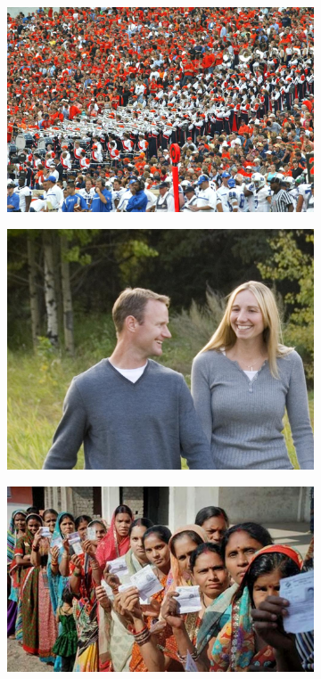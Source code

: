 \begin{figure}[t]
\centering
\begin{subfigure}[b]{0.3\textwidth}
    \includegraphics[width=\textwidth]{figures/data_1}
\end{subfigure}
\begin{subfigure}[b]{0.3\textwidth}
    \includegraphics[width=\textwidth]{figures/data_2}
\end{subfigure}
\begin{subfigure}[b]{0.3\textwidth}
    \includegraphics[width=\textwidth]{figures/data_3}

\end{subfigure}
\end{figure}
